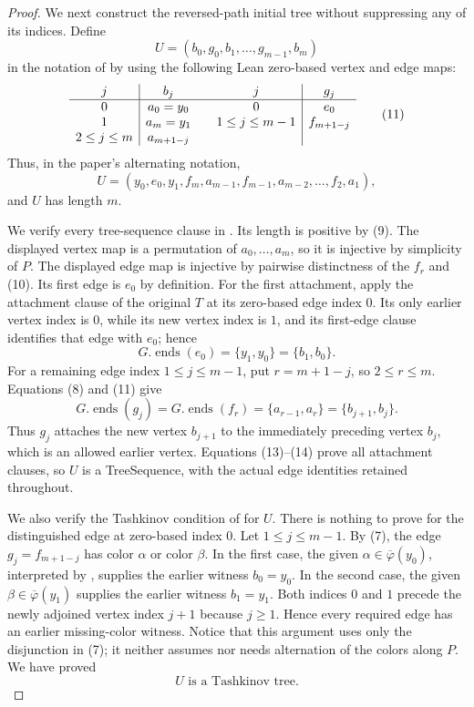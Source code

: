 \begin{proof}
We next construct the reversed-path initial tree without suppressing any
of its indices.  Define
\[
 U=(b_0,g_0,b_1,\ldots,g_{m-1},b_m)
\]
in the notation of  by using the following Lean
zero-based vertex and edge maps:
\[
 \begin{array}{c|c@{\qquad}c|c}
 j&b_j&j&g_j\\ \hline
 0&a_0=y_0&0&e_0\\
 1&a_m=y_1&1\leq j\leq m-1&f_{m+1-j}\\
 2\leq j\leq m&a_{m+1-j}&&
 \end{array}                                                       \tag{11}
\]
Thus, in the paper's alternating notation,
\[
 U=(y_0,e_0,y_1,f_m,a_{m-1},f_{m-1},a_{m-2},
          \ldots,f_2,a_1),                                       \tag{12}
\]
and $U$ has length $m$.

We verify every tree-sequence clause in .  Its
length is positive by (9).  The displayed vertex map is a permutation of
$a_0,\ldots,a_m$, so it is injective by simplicity of $P$.  The displayed
edge map is injective by pairwise distinctness of the $f_r$ and (10).
Its first edge is $e_0$ by definition.  For the first attachment, apply
the attachment clause of the original $T$ at its zero-based edge index
$0$.  Its only earlier vertex index is $0$, while its new vertex index is
$1$, and its first-edge clause identifies that edge with $e_0$; hence
\[
             G.\operatorname{ends}(e_0)=\{y_1,y_0\}
                   =\{b_1,b_0\}.                                \tag{13}
\]
For a remaining edge index $1\leq j\leq m-1$, put
$r=m+1-j$, so $2\leq r\leq m$.  Equations (8) and (11) give
\[
 G.\operatorname{ends}(g_j)
   =G.\operatorname{ends}(f_r)
   =\{a_{r-1},a_r\}=\{b_{j+1},b_j\}.                             \tag{14}
\]
Thus $g_j$ attaches the new vertex $b_{j+1}$ to the immediately preceding
vertex $b_j$, which is an allowed earlier vertex.  Equations (13)--(14)
prove all attachment clauses, so $U$ is a TreeSequence, with the actual
edge identities retained throughout.

We also verify the Tashkinov condition of  for
$U$.  There is nothing to prove for the distinguished edge at zero-based
index $0$.  Let $1\leq j\leq m-1$.  By (7), the edge
$g_j=f_{m+1-j}$ has color $\alpha$ or color $\beta$.  In the first case,
the given $\alpha\in\overline\varphi(y_0)$, interpreted by
, supplies the earlier witness $b_0=y_0$.  In the
second case, the given $\beta\in\overline\varphi(y_1)$ supplies the
earlier witness $b_1=y_1$.  Both indices $0$ and $1$ precede the newly
adjoined vertex index $j+1$ because $j\geq1$.  Hence every required edge
has an earlier missing-color witness.  Notice that this argument uses
only the disjunction in (7); it neither assumes nor needs alternation of
the colors along $P$.  We have proved
\[
                    U\text{ is a Tashkinov tree}.                 \tag{15}
\]


\end{proof}

